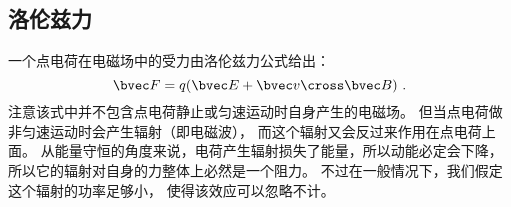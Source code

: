 \subsection{洛伦兹力}
一个点电荷在电磁场中的受力由洛伦兹力公式给出：
$$
\bvec F = q (\bvec E + \bvec v \cross \bvec B)~.
$$
注意该式中并不包含点电荷静止或匀速运动时自身产生的电磁场。 但当点电荷做非匀速运动时会产生辐射（即电磁波）， 而这个辐射又会反过来作用在点电荷上面。 从能量守恒的角度来说，电荷产生辐射损失了能量，所以动能必定会下降，所以它的辐射对自身的力整体上必然是一个阻力。 不过在一般情况下，我们假定这个辐射的功率足够小， 使得该效应可以忽略不计。

